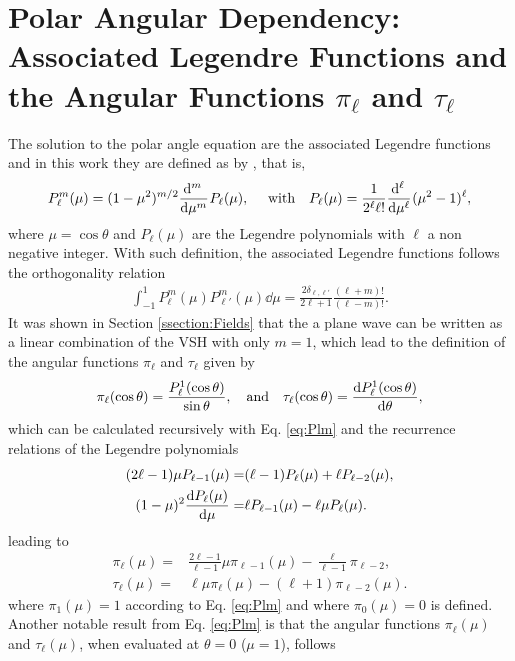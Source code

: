\section*{Polar Angular Dependency: Associated Legendre Functions and the Angular Functions $\pi_\ell$ and $\tau_\ell$}
The solution to the polar angle equation are the associated Legendre functions and in this work they are defined as by \citeauthor{arfken_mathematical_2001} \cite{arfken_mathematical_2001}, that is,
%
\begin{equation}
P_\ell^m(\mu) = (1-\mu^2)^{m/2}\dv[m]{\,}{\mu}\hspace*{.05em} P_\ell(\mu),
\qqtext{ with}
P_\ell(\mu) = \frac{1}{2^\ell \ell!}\dv[\ell]{\,}{\mu}\hspace*{.05em}  (\mu^2-1)^\ell ,
\label{eq:Plm}
\end{equation}
%
where $\mu = \cos\theta$ and $P_\ell(\mu)$ are the Legendre polynomials with $\ell$ a non negative integer. With such definition, the  associated Legendre functions follows the orthogonality relation
%
\begin{align}
\int_{-1}^1 P_\ell^m(\mu)P_{\ell'}^m(\mu)\dd{\mu} = \frac{2\delta_{\ell,\ell'}}{2\ell+1}\frac{(\ell+m)!}{(\ell-m)!}.
\label{eq:PlmOrtho}
\end{align}
%
It was shown in Section \ref{ssection:Fields} that the a plane wave can be written as a linear combination of the VSH with only $m = 1$, which lead to the definition of the angular functions $\pi_\ell$ and $\tau_\ell$ given by
%
\begin{align*}
 \pi_\ell(\cos\theta )  = \frac{P_\ell^1(\cos\theta)}{\sin\theta},\qqtext{and}
 \tau_\ell(\cos\theta) = \dv{P_\ell^1(\cos\theta)}{\theta},
\end{align*}
%
which can be calculated recursively with Eq. \eqref{eq:Plm}  and the recurrence relations of the Legendre polynomials
%
\begin{align}
(2\ell-1)\mu P_{\ell-1}(\mu) =& (\ell-1) P_{\ell}(\mu) + \ell P_{\ell-2}(\mu),\\
(1-\mu)^2\dv{P_\ell(\mu)}{\mu} =& \ell P_{\ell-1}(\mu) - \ell\mu P_\ell(\mu).
\end{align}
%
leading to
%
\begin{align}
\pi_\ell(\mu) =& \frac{2\ell-1}{\ell-1}\mu \pi_{\ell-1}(\mu) - \frac{\ell}{\ell-1}\pi_{\ell-2},\\
\tau_ \ell (\mu) =& \ell\mu\pi_\ell(\mu) - (\ell+1)\pi_{\ell-2}(\mu).
\end{align}
%
where $\pi_1(\mu) = 1$ according to  Eq. \eqref{eq:Plm} and where $\pi_0(\mu)=0$ is defined. Another notable result from Eq. \eqref{eq:Plm} is that the angular functions $\pi_\ell(\mu)$ and $\tau_\ell(\mu)$, when evaluated at $\theta =0$ ($\mu = 1$),  follows

